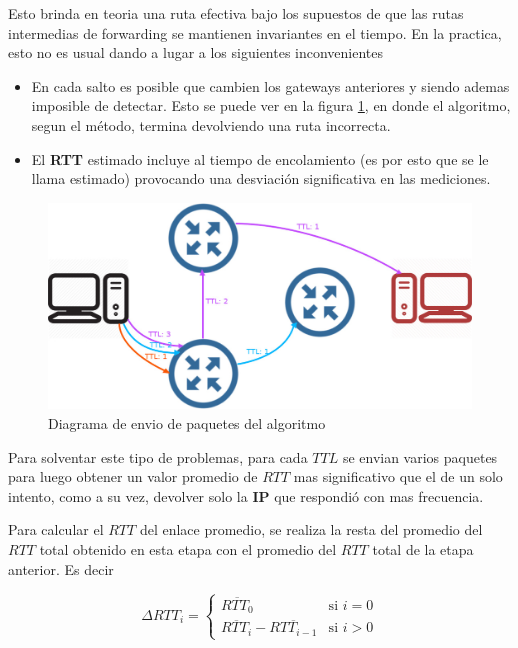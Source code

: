 Esto brinda en teoria una ruta efectiva bajo los supuestos de que
las rutas intermedias de forwarding se mantienen invariantes en el tiempo. En
la practica, esto no es usual dando a lugar a los siguientes inconvenientes

\begin{itemize}
	\item En cada salto es posible que cambien los gateways anteriores y siendo
	ademas imposible de detectar. Esto se puede ver en la figura \ref{fig:diagramareal},
	en donde el algoritmo, segun el método, termina devolviendo una ruta incorrecta.
	\item El \textbf{RTT} estimado incluye al tiempo de encolamiento (es por esto
	que se le llama estimado) provocando una desviación significativa en las
	mediciones.
\end{itemize}

\begin{figure}[ht]
	\begin{center}
		\includegraphics[width=0.8\columnwidth]{imagenes/diagrama_2.jpg}
		\caption{Diagrama de envio de paquetes del algoritmo}
		\label{fig:diagramareal}
	\end{center}
\end{figure}

Para solventar este tipo de problemas, para cada $TTL$ se envian varios paquetes
para luego obtener un valor promedio de $RTT$ mas significativo que el de un
solo intento, como a su vez, devolver solo la \textbf{IP} que respondió con mas
frecuencia.

Para calcular el $RTT$ del enlace promedio, se realiza la resta
del promedio del $RTT$ total obtenido en esta etapa con el promedio del $RTT$ total
de la etapa anterior.
Es decir

\begin{equation}
	\Delta RTT_{i} = \left\{
		\begin{array}{cl}
			\overline{RTT_{0}} & \mbox{si } i = 0\\
			\overline{RTT_{i}} - \overline{RTT_{i-1}} & \mbox{si } i > 0
		\end{array}
		\right.
\end{equation}

